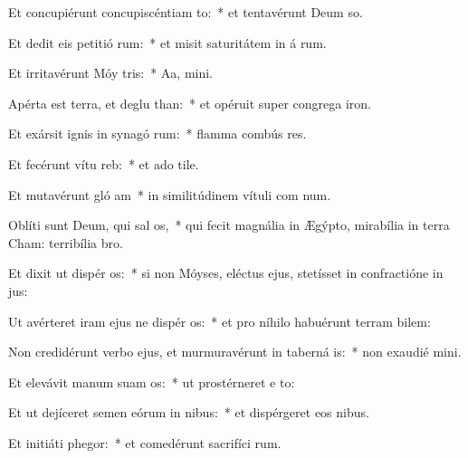\item Et concupiérunt concupiscéntiam  to:~* et tentavérunt Deum  so.
\item Et dedit eis petitió rum:~* et misit saturitátem in á rum.
\item Et irritavérunt Móy  tris:~* Aa,  mini.
\item Apérta est terra, et deglu than:~* et opéruit super congrega iron.
\item Et exársit ignis in synagó rum:~* flamma combús res.
\item Et fecérunt vítu  reb:~* et ado tile.
\item Et mutavérunt gló am~* in similitúdinem vítuli com num.
\item Oblíti sunt Deum, qui sal os,~* qui fecit magnália in Ægýpto, mirabília in terra Cham: terribília   bro.
\item Et dixit ut dispér os:~* si non Móyses, eléctus ejus, stetísset in confractióne in  jus:
\item Ut avérteret iram ejus ne dispér os:~* et pro níhilo habuérunt terram bilem:
\item Non credidérunt verbo ejus, et murmuravérunt in taberná is:~* non exaudié  mini.
\item Et elevávit manum suam  os:~* ut prostérneret e  to:
\item Et ut dejíceret semen eórum in nibus:~* et dispérgeret eos  nibus.
\item Et initiáti  phegor:~* et comedérunt sacrifíci rum.
